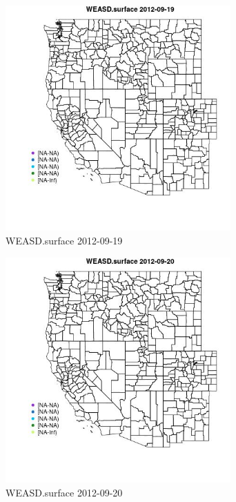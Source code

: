\begin{figure} 
\centering  
\includegraphics[width=0.77\textwidth]{Code_Outputs/ML_input_report_ML_input_PM25_Step5_part_d_de_duplicated_aves_ML_input_MapObsWEASDsurface2012-09-19.jpg} 
\caption{\label{fig:ML_input_report_ML_input_PM25_Step5_part_d_de_duplicated_aves_ML_inputMapObsWEASDsurface2012-09-19}WEASD.surface 2012-09-19} 
\end{figure} 
 

\begin{figure} 
\centering  
\includegraphics[width=0.77\textwidth]{Code_Outputs/ML_input_report_ML_input_PM25_Step5_part_d_de_duplicated_aves_ML_input_MapObsWEASDsurface2012-09-20.jpg} 
\caption{\label{fig:ML_input_report_ML_input_PM25_Step5_part_d_de_duplicated_aves_ML_inputMapObsWEASDsurface2012-09-20}WEASD.surface 2012-09-20} 
\end{figure} 
 

